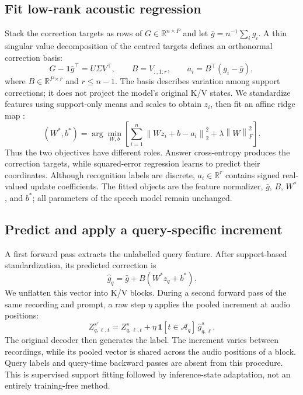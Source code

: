 \documentclass{article}
\newcommand{\R}{\mathbb R}
\newcommand{\Aset}{\mathcal A}
\newcommand{\norm}[1]{\left\lVert#1\right\rVert}
\begin{document}
\subsection{Fit low-rank acoustic regression}
Stack the correction targets as rows of $G\in\R^{n\times P}$ and let $\bar g=n^{-1}\sum_i g_i$. A thin singular value decomposition of the centred targets defines an orthonormal correction basis:
\begin{equation}
G-\mathbf1\bar g^\top=U\Sigma V^\top,
\qquad B=V_{:,1:r},
\qquad a_i=B^\top(g_i-\bar g),
\label{eq:svd}
\end{equation}
where $B\in\R^{P\times r}$ and $r\leq n-1$. The basis describes variation among support corrections; it does not project the model's original K/V states. We standardize features using support-only means and scales to obtain $z_i$, then fit an affine ridge map \citep{hoerl1970ridge}:
\begin{equation}
(W^*,b^*)=\arg\min_{W,b}
\left[\sum_{i=1}^{n}\norm{Wz_i+b-a_i}_2^2
+\lambda\norm{W}_F^2\right].
\label{eq:regression}
\end{equation}
Thus the two objectives have different roles. Answer cross-entropy produces the correction targets, while squared-error regression learns to predict their coordinates. Although recognition labels are discrete, $a_i\in\R^r$ contains signed real-valued update coefficients. The fitted objects are the feature normalizer, $\bar g$, $B$, $W^*$, and $b^*$; all parameters of the speech model remain unchanged.

\subsection{Predict and apply a query-specific increment}
A first forward pass extracts the unlabelled query feature. After support-based standardization, its predicted correction is
\begin{equation}
\boxed{\widehat g_q=\bar g+B(W^*z_q+b^*).}
\label{eq:prediction}
\end{equation}
We unflatten this vector into K/V blocks. During a second forward pass of the same recording and prompt, a raw step $\eta$ applies the pooled increment at audio positions:
\begin{equation}
Z^{s\prime}_{q,\ell,t}
=Z^s_{q,\ell,t}
+\eta\,\mathbf1[t\in\Aset_q]\,\widehat g^s_{q,\ell}.
\label{eq:update}
\end{equation}
The original decoder then generates the label. The increment varies between recordings, while its pooled vector is shared across the audio positions of a block. Query labels and query-time backward passes are absent from this procedure. This is supervised support fitting followed by inference-state adaptation, not an entirely training-free method.
\end{document}
